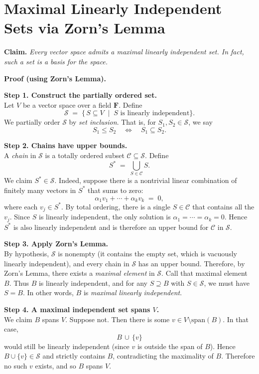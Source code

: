 \documentclass[12pt]{article}
\title{}
\author{Jerich Lee}
\date{\today}
\theoremstyle{definition} %
\theoremstyle{plain} %
\begin{document}
\maketitle
\section*{Maximal Linearly Independent Sets via Zorn's Lemma}

\noindent
\textbf{Claim.} \emph{Every vector space admits a maximal linearly independent set. In fact, such a set is a basis for the space.}

\bigskip
\noindent
\textbf{Proof (using Zorn's Lemma).}

\medskip
\noindent
\textbf{Step 1. Construct the partially ordered set.}\\
Let $V$ be a vector space over a field $\mathbf{F}$. Define 
\[
\mathcal{S} \;=\; \{\,S \subseteq V \;\mid\; S \text{ is linearly independent}\}.
\]
We partially order $\mathcal{S}$ by \emph{set inclusion}. That is, for $S_1, S_2 \in \mathcal{S}$, we say 
\[
S_1 \le S_2 \quad \Longleftrightarrow \quad S_1 \subseteq S_2.
\]

\medskip
\noindent
\textbf{Step 2. Chains have upper bounds.}\\
A \emph{chain} in $\mathcal{S}$ is a totally ordered subset $\mathcal{C} \subseteq \mathcal{S}$. Define
\[
S^* \;=\; \bigcup_{S \in \mathcal{C}} S.
\]
We claim $S^* \in \mathcal{S}$. Indeed, suppose there is a nontrivial linear combination of finitely many vectors in $S^*$ that sums to zero:
\[
\alpha_1 v_1 + \cdots + \alpha_k v_k \;=\; 0,
\]
where each $v_j \in S^*$. By total ordering, there is a single $S \in \mathcal{C}$ that contains all the $v_j$. Since $S$ is linearly independent, the only solution is $\alpha_1 = \cdots = \alpha_k = 0$. Hence $S^*$ is also linearly independent and is therefore an upper bound for $\mathcal{C}$ in $\mathcal{S}$.

\medskip
\noindent
\textbf{Step 3. Apply Zorn's Lemma.}\\
By hypothesis, $\mathcal{S}$ is nonempty (it contains the empty set, which is vacuously linearly independent), and every chain in $\mathcal{S}$ has an upper bound. Therefore, by Zorn's Lemma, there exists a \emph{maximal element} in $\mathcal{S}$. Call that maximal element $B$. Thus $B$ is linearly independent, and for any $S \supseteq B$ with $S \in \mathcal{S}$, we must have $S=B$. In other words, $B$ is \emph{maximal linearly independent}.

\medskip
\noindent
\textbf{Step 4. A maximal independent set spans $V$.}\\
We claim $B$ spans $V$. Suppose not. Then there is some $v \in V \setminus \mathrm{span}(B)$. In that case,
\[
B \,\cup\, \{v\}
\]
would still be linearly independent (since $v$ is outside the span of $B$). Hence $B \cup \{v\} \in \mathcal{S}$ and strictly contains $B$, contradicting the maximality of $B$. Therefore no such $v$ exists, and so $B$ spans $V$.
\end{document}
